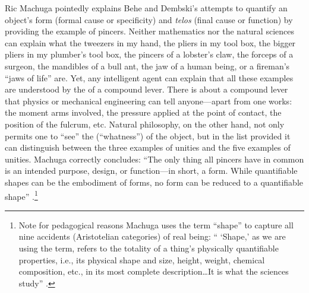 Ric Machuga pointedly explains Behe and Dembski's attempts to quantify an object's form (formal cause or specificity) and \textit{telos} (final cause or function) by providing the example of pincers. Neither mathematics nor the natural sciences can explain what the tweezers in my hand, the pliers in my tool box, the bigger pliers in my plumber's tool box, the pincers of a lobster's claw, the forceps of a surgeon, the mandibles of a bull ant, the jaw of a human being, or a fireman's ``jaws of life'' are. Yet, any intelligent agent can explain that all these examples are understood by the  of a compound lever. There is  about  a compound lever  that physics or mechanical engineering can tell anyone---apart from  one works: the moment arms involved, the pressure applied at the point of contact, the position of the fulcrum, etc. Natural philosophy, on the other hand, not only permits one to ``see'' the  (``whatness'') of the object, but in the list provided it can distinguish between the three examples of  unities and the five examples of  unities. Machuga correctly concludes: ``The only thing all pincers have in common is an intended purpose, design, or function---in short, a form. While quantifiable shapes can be the embodiment of forms, no form can be reduced to a quantifiable shape'' \cite[p.~162]{machuga}.\footnote{Note for pedagogical reasons Machuga uses the term ``shape'' to capture all nine accidents (Aristotelian categories) of real being: `` `Shape,' as we are using the term, refers to the totality of a thing's physically quantifiable properties, i.e., its physical shape and size, height, weight, chemical composition, etc., in its most complete description\ldots It is what the sciences study'' \citep[][p.~27]{machuga}.}

